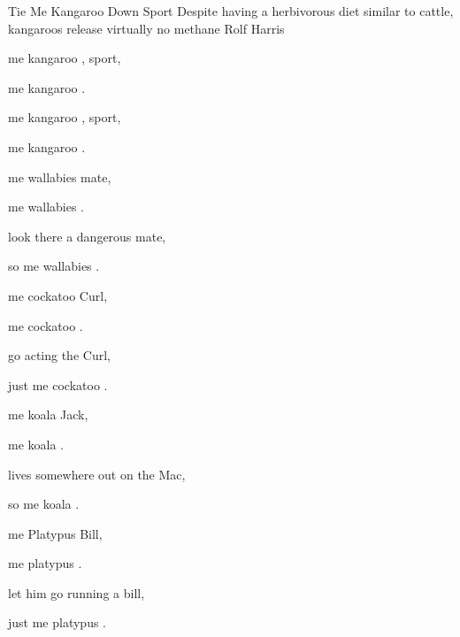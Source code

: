 \begin{SBSong}{Tie Me Kangaroo Down Sport}
  {Despite having a herbivorous diet similar to cattle, kangaroos release virtually no methane}
  {Rolf Harris}
  \begin{SBChorus}           
     me kangaroo , sport,
 
     me kangaroo .
    
     me kangaroo , sport,

     me kangaroo .
  \end{SBChorus}
  \begin{SBVerse}
     me wallabies  mate, 

     me wallabies .

     look there a dangerous  mate, 

    so  me wallabies .
  \end{SBVerse}
  \begin{SBVerse}
     me cockatoo  Curl, 
    
     me cockatoo .

     go acting the  Curl, 

    just  me cockatoo .
  \end{SBVerse}
  \begin{SBVerse}
     me koala  Jack, 

     me koala .
     
     lives somewhere out on the  Mac, 

    so  me koala .
  \end{SBVerse}
  \begin{SBVerse} 
     me Platypus  Bill, 

     me platypus .

     let him go running a  bill, 

    just  me platypus .
  \end{SBVerse}
\end{SBSong}
